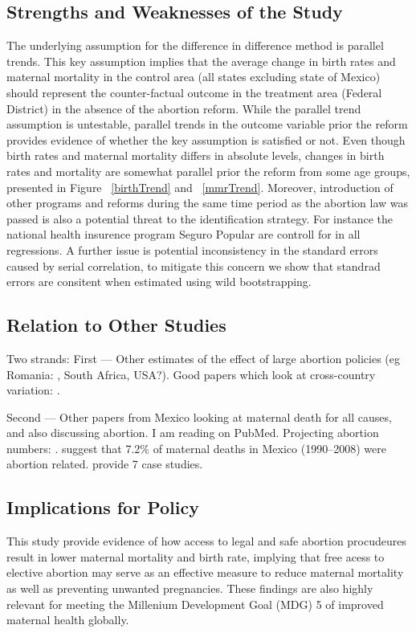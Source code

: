 \documentclass[a4paper, 11pt]{article}
\begin{document}
\begin{spacing}{1.5}
\begin{multicols}{2}
\subsection{Strengths and Weaknesses of the Study}
 The underlying assumption for the difference in difference method is parallel trends. This key assumption implies that the average change in birth rates and maternal mortality in the control area (all states excluding state of Mexico) should represent the counter-factual outcome in the treatment area (Federal District) in the absence of the abortion reform. While the parallel trend assumption is untestable, parallel trends in the outcome variable prior the reform provides evidence of whether the key assumption is satisfied or not. Even though birth rates and maternal mortality differs in absolute levels, changes in birth rates and mortality are somewhat parallel prior the reform from some age groups, presented in Figure ~\ref{birthTrend} and  ~\ref{mmrTrend}. Moreover, introduction of other programs and reforms during the same time period as the abortion law was passed is also a potential threat to the identification strategy. For instance the national health insurence program Seguro Popular are controll for in all regressions. A further issue is potential inconsistency in the standard errors caused by serial correlation, to mitigate this concern we show that standrad errors are consitent when estimated using wild bootstrapping.  
\subsection{Relation to Other Studies}
Two strands: First --- Other estimates of the effect of large abortion policies (eg Romania: \citet{Johnsonetal2004}, South Africa, USA?).  Good papers which look at cross-country variation: \citet{Berer2004,Berer2006,Singh2006}.  

Second --- Other papers from Mexico looking at maternal death for all causes, and also discussing abortion.  I am reading on PubMed. Projecting abortion numbers: \citet{Huetal2007}. \citet{Schiavonetal2012} suggest that 7.2\% of maternal deaths in Mexico (1990--2008) were abortion related. \citet{vanDijketal2012} provide 7 case studies.

\subsection{Implications for Policy}
This study provide evidence of how access to legal and safe abortion procudeures result in lower maternal mortality and birth rate, implying that free acess to elective abortion may serve as an effective measure to reduce maternal mortality as well as preventing unwanted pregnancies. These findings are also highly relevant for meeting the Millenium Development Goal (MDG) 5 of improved maternal health globally.        

\end{multicols}
\end{spacing}
\end{document}
